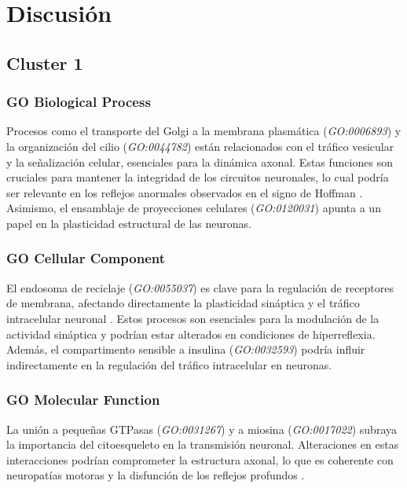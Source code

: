 \section{Discusión}
\subsection{Cluster 1}

\subsubsection{GO Biological Process}

Procesos como el transporte del Golgi a la membrana plasmática (\textit{GO:0006893}) y la organización del cilio (\textit{GO:0044782}) están relacionados con el tráfico vesicular y la señalización celular, esenciales para la dinámica axonal. Estas funciones son cruciales para mantener la integridad de los circuitos neuronales, lo cual podría ser relevante en los reflejos anormales observados en el signo de Hoffman \cite{nachury_ciliary_2010}. Asimismo, el ensamblaje de proyecciones celulares (\textit{GO:0120031}) apunta a un papel en la plasticidad estructural de las neuronas.

\subsubsection{GO Cellular Component}

El endosoma de reciclaje (\textit{GO:0055037}) es clave para la regulación de receptores de membrana, afectando directamente la plasticidad sináptica y el tráfico intracelular neuronal \cite{goldenring_endosome_2019}. Estos procesos son esenciales para la modulación de la actividad sináptica y podrían estar alterados en condiciones de hiperreflexia. Además, el compartimento sensible a insulina (\textit{GO:0032593}) podría influir indirectamente en la regulación del tráfico intracelular en neuronas.

\subsubsection{GO Molecular Function}

La unión a pequeñas GTPasas (\textit{GO:0031267}) y a miosina (\textit{GO:0017022}) subraya la importancia del citoesqueleto en la transmisión neuronal. Alteraciones en estas interacciones podrían comprometer la estructura axonal, lo que es coherente con neuropatías motoras y la disfunción de los reflejos profundos \cite{feiguin_axonal_transport_2001}.


